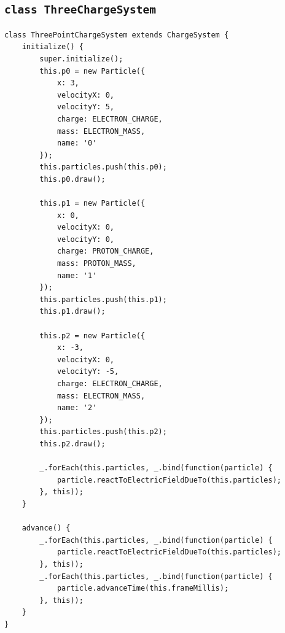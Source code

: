 \documentclass[11pt]{article}
\begin{document}
\subsection{\texttt{class ThreeChargeSystem}}
\label{sec-8-8}
\begin{verbatim}
class ThreePointChargeSystem extends ChargeSystem {
    initialize() {
        super.initialize();
        this.p0 = new Particle({
            x: 3,
            velocityX: 0,
            velocityY: 5,
            charge: ELECTRON_CHARGE,
            mass: ELECTRON_MASS,
            name: '0'
        });
        this.particles.push(this.p0);
        this.p0.draw();

        this.p1 = new Particle({
            x: 0,
            velocityX: 0,
            velocityY: 0,
            charge: PROTON_CHARGE,
            mass: PROTON_MASS,
            name: '1'
        });
        this.particles.push(this.p1);
        this.p1.draw();

        this.p2 = new Particle({
            x: -3,
            velocityX: 0,
            velocityY: -5,
            charge: ELECTRON_CHARGE,
            mass: ELECTRON_MASS,
            name: '2'
        });
        this.particles.push(this.p2);
        this.p2.draw();

        _.forEach(this.particles, _.bind(function(particle) {
            particle.reactToElectricFieldDueTo(this.particles);
        }, this));
    }

    advance() {
        _.forEach(this.particles, _.bind(function(particle) {
            particle.reactToElectricFieldDueTo(this.particles);
        }, this));
        _.forEach(this.particles, _.bind(function(particle) {
            particle.advanceTime(this.frameMillis);
        }, this));
    }
}
\end{verbatim}
\end{document}
